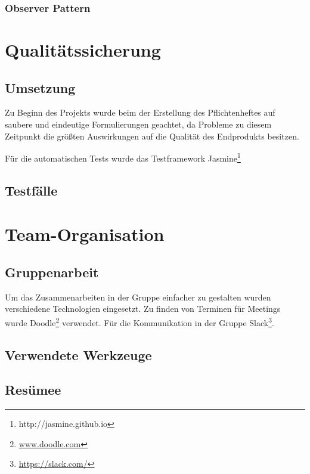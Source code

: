 \subsection{Observer Pattern}

\chapter{Qualitätssicherung}
\section{Umsetzung}
Zu Beginn des Projekts wurde beim der Erstellung des Pflichtenheftes auf saubere und eindeutige Formulierungen geachtet, da Probleme zu diesem Zeitpunkt die größten Auswirkungen auf die Qualität des Endprodukts besitzen.


Für die automatischen Tests wurde das Testframework Jasmine\footnote{http://jasmine.github.io}

\section{Testfälle}


\chapter{Team-Organisation}
\section{Gruppenarbeit}
Um das Zusammenarbeiten in der Gruppe einfacher zu gestalten wurden verschiedene Technologien eingesetzt.
Zu finden von Terminen für Meetings wurde Doodle\footnote{\url{www.doodle.com}}  verwendet. Für die Kommunikation in der Gruppe Slack\footnote{\url{https://slack.com/}}.
\section{Verwendete Werkzeuge}
\section{Resümee}
